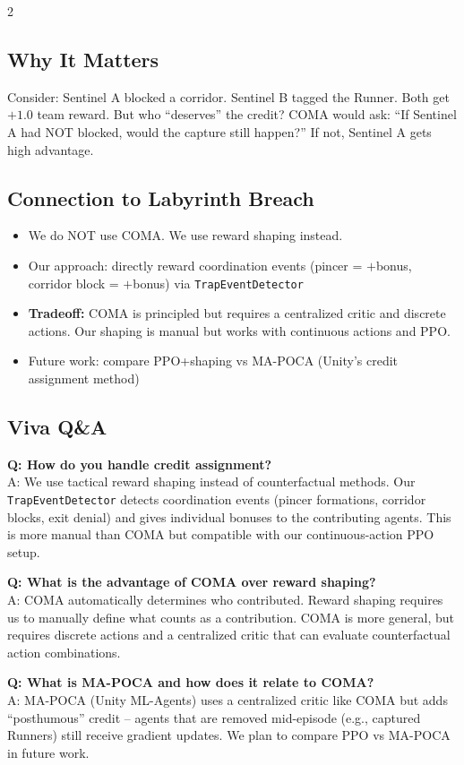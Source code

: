 \documentclass[10pt,a4paper]{article}
\begin{document}
\begin{multicols}{2}
\subsection{Why It Matters}
Consider: Sentinel A blocked a corridor. Sentinel B tagged the Runner. Both get $+1.0$ team reward. But who ``deserves'' the credit? COMA would ask: ``If Sentinel A had NOT blocked, would the capture still happen?'' If not, Sentinel A gets high advantage.

\subsection{Connection to Labyrinth Breach}
\begin{itemize}
\item We do NOT use COMA. We use reward shaping instead.
\item Our approach: directly reward coordination events (pincer = $+$bonus, corridor block = $+$bonus) via \texttt{TrapEventDetector}
\item \textbf{Tradeoff:} COMA is principled but requires a centralized critic and discrete actions. Our shaping is manual but works with continuous actions and PPO.
\item Future work: compare PPO+shaping vs MA-POCA (Unity's credit assignment method)
\end{itemize}

\subsection{Viva Q\&A}

\textbf{Q: How do you handle credit assignment?} \\
A: We use tactical reward shaping instead of counterfactual methods. Our \texttt{TrapEventDetector} detects coordination events (pincer formations, corridor blocks, exit denial) and gives individual bonuses to the contributing agents. This is more manual than COMA but compatible with our continuous-action PPO setup.

\textbf{Q: What is the advantage of COMA over reward shaping?} \\
A: COMA automatically determines who contributed. Reward shaping requires us to manually define what counts as a contribution. COMA is more general, but requires discrete actions and a centralized critic that can evaluate counterfactual action combinations.

\textbf{Q: What is MA-POCA and how does it relate to COMA?} \\
A: MA-POCA (Unity ML-Agents) uses a centralized critic like COMA but adds ``posthumous'' credit -- agents that are removed mid-episode (e.g., captured Runners) still receive gradient updates. We plan to compare PPO vs MA-POCA in future work.


\end{multicols}
\end{document}
